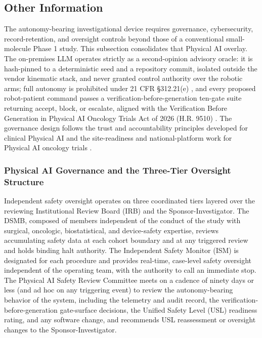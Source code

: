 \subsection{Other Information}

The autonomy-bearing investigational device requires governance, cybersecurity,
record-retention, and oversight controls beyond those of a conventional
small-molecule Phase 1 study. This subsection consolidates that Physical AI overlay.
The on-premises LLM operates strictly as a second-opinion advisory oracle: it is
hash-pinned to a deterministic seed and a repository commit, isolated outside the
vendor kinematic stack, and never granted control authority over the robotic arms;
full autonomy is prohibited under 21 CFR \S 312.21(e) \cite{cfr312paiuni}, and every
proposed robot-patient command passes a verification-before-generation ten-gate
suite returning accept, block, or escalate, aligned with the Verification Before
Generation in Physical AI Oncology Trials Act of 2026 (H.R. 9510)
\cite{congress9510}. The governance design follows the trust and accountability
principles developed for clinical Physical AI \cite{clintrustpai,paiautospons} and
the site-readiness and national-platform work for Physical AI oncology trials
\cite{natlpaiplatf,paisitedocpk}.

\subsubsection{Physical AI Governance and the Three-Tier Oversight Structure}

Independent safety oversight operates on three coordinated tiers layered over the
reviewing Institutional Review Board (IRB) and the Sponsor-Investigator. The DSMB,
composed of members independent of the conduct of the study with surgical,
oncologic, biostatistical, and device-safety expertise, reviews accumulating safety
data at each cohort boundary and at any triggered review and holds binding halt
authority. The Independent Safety Monitor (ISM) is designated for each procedure and
provides real-time, case-level safety oversight independent of the operating team,
with the authority to call an immediate stop. The Physical AI Safety Review
Committee meets on a cadence of ninety days or less (and ad hoc on any triggering
event) to review the autonomy-bearing behavior of the system, including the
telemetry and audit record, the verification-before-generation gate-surface
decisions, the Unified Safety Level (USL) readiness rating, and any software change,
and recommends USL reassessment or oversight changes to the Sponsor-Investigator.

